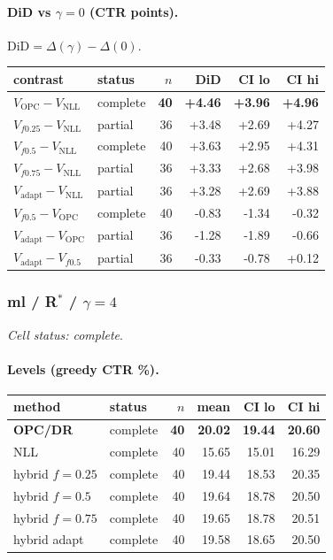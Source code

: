 \documentclass[10pt,a4paper]{article}
\begin{document}
\paragraph{DiD vs $\gamma=0$ (CTR points).} $\mathrm{DiD}=\Delta(\gamma)-\Delta(0)$.
{\centering\small\begin{tabular}{llrrrr}
\toprule contrast & status & $n$ & DiD & CI lo & CI hi \\
\midrule
\textbf{$V_{\mathrm{OPC}}-V_{\mathrm{NLL}}$} & complete & \textbf{40} & \textbf{+4.46} & \textbf{+3.96} & \textbf{+4.96} \\
$V_{f0.25}-V_{\mathrm{NLL}}$ & partial & 36 & +3.48 & +2.69 & +4.27 \\
$V_{f0.5}-V_{\mathrm{NLL}}$ & complete & 40 & +3.63 & +2.95 & +4.31 \\
$V_{f0.75}-V_{\mathrm{NLL}}$ & partial & 36 & +3.33 & +2.68 & +3.98 \\
$V_{\mathrm{adapt}}-V_{\mathrm{NLL}}$ & partial & 36 & +3.28 & +2.69 & +3.88 \\
$V_{f0.5}-V_{\mathrm{OPC}}$ & complete & 40 & -0.83 & -1.34 & -0.32 \\
$V_{\mathrm{adapt}}-V_{\mathrm{OPC}}$ & partial & 36 & -1.28 & -1.89 & -0.66 \\
$V_{\mathrm{adapt}}-V_{f0.5}$ & partial & 36 & -0.33 & -0.78 & +0.12 \\
\bottomrule\end{tabular}\par}
\bigskip
\subsubsection{ml / R$^*$ / $\gamma=4$}
\emph{Cell status: complete}.
\paragraph{Levels (greedy CTR \%).}
{\centering\small\begin{tabular}{llrrrr}
\toprule method & status & $n$ & mean & CI lo & CI hi \\
\midrule
\textbf{OPC/DR} & complete & \textbf{40} & \textbf{20.02} & \textbf{19.44} & \textbf{20.60} \\
NLL & complete & 40 & 15.65 & 15.01 & 16.29 \\
hybrid $f{=}0.25$ & complete & 40 & 19.44 & 18.53 & 20.35 \\
hybrid $f{=}0.5$ & complete & 40 & 19.64 & 18.78 & 20.50 \\
hybrid $f{=}0.75$ & complete & 40 & 19.65 & 18.78 & 20.51 \\
hybrid adapt & complete & 40 & 19.58 & 18.65 & 20.50 \\
\bottomrule\end{tabular}\par}
\end{document}
